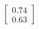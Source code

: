 \documentclass[preview]{standalone}
\begin{document}
\begin{align*}
\begin{bmatrix} 0.74 \\ 0.63 \end{bmatrix}
\end{align*}
\end{document}

